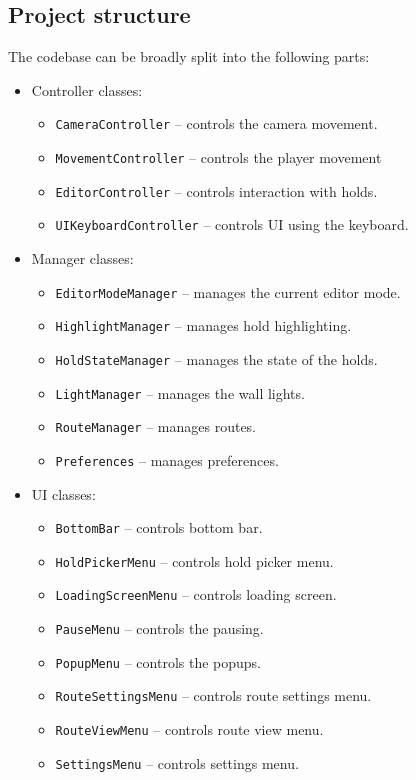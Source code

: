 \subsection{Project structure}
The codebase can be broadly split into the following parts:

\begin{itemize}
	\item Controller classes:
	\begin{itemize}
		\item \verb|CameraController| -- controls the camera movement.
		\item \verb|MovementController| -- controls the player movement
		\item \verb|EditorController| -- controls interaction with holds.
		\item \verb|UIKeyboardController| -- controls UI using the keyboard.
	\end{itemize}
	\item Manager classes:
	\begin{itemize}
		\item \verb|EditorModeManager| -- manages the current editor mode.
		\item \verb|HighlightManager| -- manages hold highlighting.
		\item \verb|HoldStateManager| -- manages the state of the holds.
		\item \verb|LightManager| -- manages the wall lights.
		\item \verb|RouteManager| -- manages routes.
		\item \verb|Preferences| -- manages preferences.
	\end{itemize}
	\item UI classes:
	\begin{itemize}
		\item \verb|BottomBar| -- controls bottom bar.
		\item \verb|HoldPickerMenu| -- controls hold picker menu.
		\item \verb|LoadingScreenMenu| -- controls loading screen.
		\item \verb|PauseMenu| -- controls the pausing.
		\item \verb|PopupMenu| -- controls the popups.
		\item \verb|RouteSettingsMenu| -- controls route settings menu.
		\item \verb|RouteViewMenu| -- controls route view menu.
		\item \verb|SettingsMenu| -- controls settings menu.

\end{itemize}
\end{itemize}
